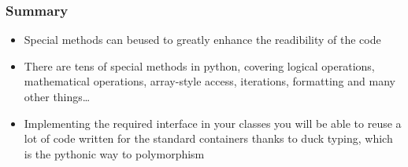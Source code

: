 \documentclass[9pt]{beamer}
\begin{document}
\begin{frame}
  \frametitle{Summary}
  \begin{itemize}
    \item Special methods can beused to greatly enhance the readibility of the code
    \bigskip
    \item There are tens of special methods in python, covering logical operations,
          mathematical operations, array-style access, iterations, formatting and
          many other things\dots
    \bigskip
    \item Implementing the required interface in your classes you will be able
          to reuse a lot of code written for the standard containers thanks to
          duck typing, which is the pythonic way to polymorphism
   \end{itemize}  
\end{frame}
\end{document}
